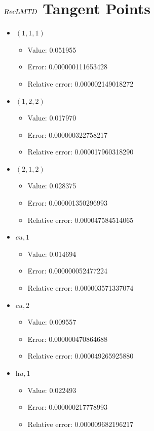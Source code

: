 \documentclass{article}%
\begin{document}
\section{$\textsl{RecLMTD}$ Tangent Points}%
\thispagestyle{plain}%
\begin{itemize}%
	\item $(1, 1, 1)$%
	\begin{itemize}%
		\item Value: 0.051955%
		\item Error: 0.000000111653428%
		\item Relative error: 0.000002149018272%
	\end{itemize}%
	\item $(1, 2, 2)$%
	\begin{itemize}%
		\item Value: 0.017970%
		\item Error: 0.000000322758217%
		\item Relative error: 0.000017960318290%
	\end{itemize}%
	\item $(2, 1, 2)$%
	\begin{itemize}%
		\item Value: 0.028375%
		\item Error: 0.000001350296993%
		\item Relative error: 0.000047584514065%
	\end{itemize}%
	\item $\textit{cu},1$%
	\begin{itemize}%
		\item Value: 0.014694%
		\item Error: 0.000000052477224%
		\item Relative error: 0.000003571337074%
	\end{itemize}%
	\item $\textit{cu},2$%
	\begin{itemize}%
		\item Value: 0.009557%
		\item Error: 0.000000470864688%
		\item Relative error: 0.000049265925880%
	\end{itemize}%
	\item $\textit{hu},1$%
	\begin{itemize}%
		\item Value: 0.022493%
		\item Error: 0.000000217778993%
		\item Relative error: 0.000009682196217%
	\end{itemize}%
\end{itemize}%
\end{document}
